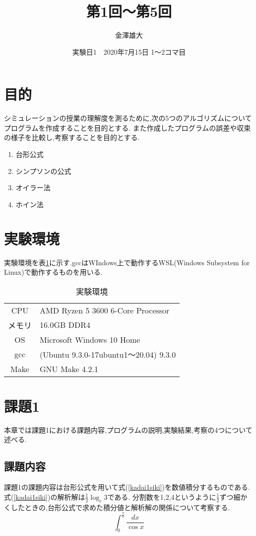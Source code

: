 \documentclass[a4j]{jarticle}
\title{第1回～第5回}
\date{実験日1　2020年7月15日 1～2コマ目}
\author{金澤雄大}
\begin{document}
    \maketitle
    \thispagestyle{empty}
    \clearpage
    \addtocounter{page}{-1}
    \section{目的}
    シミュレーションの授業の理解度を測るために,次の5つのアルゴリズムについてプログラムを作成することを目的とする.
    また作成したプログラムの誤差や収束の様子を比較し,考察することを目的とする.
  \begin{enumerate}
  \item 台形公式
  \item シンプソンの公式
  \item オイラー法
  \item ホイン法
  \end{enumerate}
  
    \section{実験環境}
      実験環境を表\ref{env}に示す.gccはWIndows上で動作するWSL(Windows Subsystem for Linux)で動作するものを用いる.
      \begin{table}[H]
        \caption{実験環境}
      \label{env}
      \begin{center}
          \begin{tabular}{c|l}\hline
            CPU & AMD Ryzen 5 3600 6-Core Processor \\ 
            メモリ & 16.0GB DDR4 \\
            OS & Microsoft Windows 10 Home \\
            gcc & (Ubuntu 9.3.0-17ubuntu1～20.04) 9.3.0 \\
            Make & GNU Make 4.2.1 \\ \hline
          \end{tabular}
      \end{center}
      \end{table}

    \section{課題1}
    本章では課題1における課題内容,プログラムの説明,実験結果,考察の4つについて述べる.
    \subsection{課題内容}
    課題1の課題内容は台形公式を用いて式(\ref{kadai1siki})を数値積分するものである.式(\ref{kadai1siki})の解析解は$\frac{1}{2} \log_{e} 3$である.
    分割数を1,2,4というように$\frac{1}{2}$ずつ細かくしたときの,台形公式で求めた積分値と解析解の関係について考察する.
    \begin{equation}
  \int_0^\frac{\pi}{6} \frac{dx}{\cos x}
      \label{kadai1siki}
    \end{equation}
\end{document}
